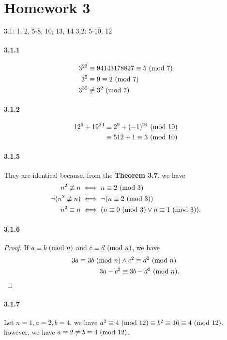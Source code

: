 \documentclass[8pt,twocolumn]{article}
\begin{document}
\section*{Homework 3}
3.1: 1, 2, 5-8, 10, 13, 14
3.2: 5-10, 12

\paragraph{3.1.1}
  \begin{align*}
    3^{23} &\equiv 94143178827 \equiv 5 \ (\mathrm{mod}\ 7) \\
    3^2 &\equiv 9 \equiv 2 \ (\mathrm{mod}\ 7) \\
    3^{32} &\not\equiv 3^2 \ (\mathrm{mod}\ 7)
  \end{align*}

\paragraph{3.1.2}
  \begin{align*}
    12^{9} + 19^{24} &\equiv 2^9 + (-1)^{24} \ (\mathrm{mod}\ 10) \\
    &\equiv 512 + 1 \equiv 3 \ (\mathrm{mod}\ 10)
  \end{align*}

\paragraph{3.1.5}
They are identical because, from the \textbf{Theorem 3.7}, we have
  \begin{align*}
    n^2 \not\equiv n &\iff n\equiv 2\ (\mathrm{mod}\ 3) \\
    \neg (n^2 \not\equiv n ) &\iff \neg (n\equiv 2\ (\mathrm{mod}\ 3)) \\
    n^2 \equiv n &\iff ( n\equiv 0\ (\mathrm{mod}\ 3) \lor n\equiv 1\ (\mathrm{mod}\ 3) ).
  \end{align*}

\paragraph{3.1.6}
\begin{proof}
  If $a\equiv b\ (\mathrm{mod}\ n)$ and $c\equiv d\ (\mathrm{mod}\ n)$, we have
  \begin{align*}
    3a \equiv 3b \ (\mathrm{mod}\ n) &\land c^2 \equiv d^2 \ (\mathrm{mod}\ n) \\
    3a-c^2 &\equiv 3b - d^2 \ (\mathrm{mod}\ n).
  \end{align*}
\end{proof}

\paragraph{3.1.7}
Let $n=1, a=2, b=4$, we have $a^2 \equiv 4 \ (\mathrm{mod}\ 12) \equiv b^2 \equiv 16 \equiv 4 \ (\mathrm{mod}\ 12)$,
however, we have $a\equiv 2 \not\equiv b\equiv 4\ (\mathrm{mod}\ 12)$.
\end{document}
